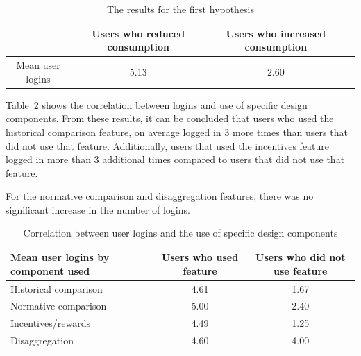 \documentclass[journal]{vgtc}                %
\begin{document}
\begin{table}
  \caption{The results for the first hypothesis}
  \label{hypo1}
  \scriptsize
  \begin{center}
    \begin{tabular}{cccc}
    \multicolumn{1}{p{1cm}}{\centering } &
       \multicolumn{1}{p{2.5cm}}{\centering Users who reduced consumption} &
       \multicolumn{1}{p{2.5cm}}{\centering Users who increased consumption} \\
    \hline
      Mean user logins &  5.13 & 2.60\\

    \end{tabular}
  \end{center}
\end{table}

Table~\ref{hypo2} shows the correlation between logins and use of specific design components. From these results, it can be concluded that users who used the historical comparison feature, on average logged in 3 more times than users that did not use that feature. Additionally, users that used the incentives feature logged in more than 3 additional times compared to users that did not use that feature.

For the normative comparison and disaggregation features, there was no significant increase in the number of logins. \\

\begin{table}
  \caption{Correlation between user logins and the use of specific design components}
  \label{hypo2}
  \scriptsize
  \begin{center}
    \begin{tabular}{lcc}
    \multicolumn{1}{p{2.5cm}}{\centering Mean user logins by component used} &
       \multicolumn{1}{p{2.0cm}}{\centering Users who used feature} &
       \multicolumn{1}{p{2.0cm}}{\centering Users who did not use feature} \\
    \hline
      Historical comparison &  4.61 & 1.67 \\
      Normative comparison &  5.00 & 2.40 \\
      Incentives/rewards &  4.49 & 1.25 \\
      Disaggregation &  4.60 & 4.00 \\

    \end{tabular}
  \end{center}
\end{table}
\end{document}
